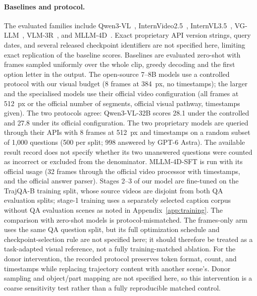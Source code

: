 \paragraph{Baselines and protocol.}
The evaluated families include Qwen3-VL~\citep{baiQwen3VLTechnicalReport2025}, InternVideo2.5~\citep{wangInternVideo25EmpoweringVideo2025}, InternVL3.5~\citep{wangInternVL35AdvancingOpenSource2025}, VG-LLM~\citep{zhengLearningVideos3D2025}, VLM-3R~\citep{fanVLM3RVisionLanguageModels2026}, and MLLM-4D~\citep{yinMLLM4DVisualbasedSpatialTemporal2026}. Exact proprietary API version strings, query dates, and several released checkpoint identifiers are not specified here, limiting exact replication of the baseline scores.
Baselines are evaluated zero-shot with frames sampled uniformly over the whole clip, greedy decoding and the first option letter in the output.
The open-source 7--8B models use a controlled protocol with our visual budget (8 frames at 384~px, no timestamps); the larger and the specialised models use their official video configuration (all frames at 512~px or the official number of segments, official visual pathway, timestamps given).
The two protocols agree: Qwen3-VL-32B scores 28.1 under the controlled and 27.8 under its official configuration.
The two proprietary models are queried through their APIs with 8 frames at 512~px and timestamps on a random subset of 1,000 questions (500 per split; 998 answered by GPT-6 Astra). The available result record does not specify whether its two unanswered questions were counted as incorrect or excluded from the denominator.
MLLM-4D-SFT is run with its official usage (32 frames through the official video processor with timestamps, and the official answer parser).
Stages 2--3 of our model are fine-tuned on the TrajQA-B training split, whose source videos are disjoint from both QA evaluation splits; stage-1 training uses a separately selected caption corpus without QA evaluation scenes as noted in Appendix~\ref{app:training}. The comparison with zero-shot models is protocol-mismatched.
The frames-only arm uses the same QA question split, but its full optimization schedule and checkpoint-selection rule are not specified here; it should therefore be treated as a task-adapted visual reference, not a fully training-matched ablation.
For the donor intervention, the recorded protocol preserves token format, count, and timestamps while replacing trajectory content with another scene's. Donor sampling and object/part mapping are not specified here, so this intervention is a coarse sensitivity test rather than a fully reproducible matched control.

